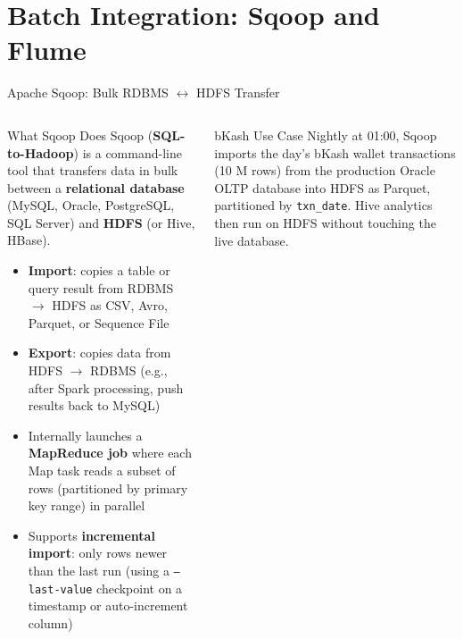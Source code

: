 \documentclass[aspectratio=169,10pt]{beamer}
\begin{document}
\section{Batch Integration: Sqoop and Flume}

\begin{frame}{Apache Sqoop: Bulk RDBMS $\leftrightarrow$ HDFS Transfer}
  \begin{columns}[T]
      \begin{block}{What Sqoop Does}
        Sqoop (\textbf{SQL-to-Hadoop}) is a command-line tool that transfers data in bulk between a \textbf{relational database} (MySQL, Oracle, PostgreSQL, SQL Server) and \textbf{HDFS} (or Hive, HBase).
        \vspace{4pt}
        \begin{itemize}
          \item \textbf{Import}: copies a table or query result from RDBMS $\to$ HDFS as CSV, Avro, Parquet, or Sequence File
          \item \textbf{Export}: copies data from HDFS $\to$ RDBMS (e.g., after Spark processing, push results back to MySQL)
          \item Internally launches a \textbf{MapReduce job} where each Map task reads a subset of rows (partitioned by primary key range) in parallel
          \item Supports \textbf{incremental import}: only rows newer than the last run (using a \texttt{--last-value} checkpoint on a timestamp or auto-increment column)
        \end{itemize}
      \end{block}
      \begin{exampleblock}{bKash Use Case}
        \small Nightly at 01:00, Sqoop imports the day's bKash wallet transactions (10 M rows) from the production Oracle OLTP database into HDFS as Parquet, partitioned by \texttt{txn\_date}.  Hive analytics then run on HDFS without touching the live database.
      \end{exampleblock}


\end{columns}
\end{frame}
\end{document}
